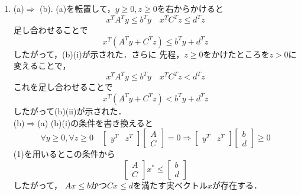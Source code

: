 \begin{enumerate}
\item 
(a)$\Rightarrow$ (b).
(a)を転置して，$y\geq 0, z \geq 0$を右からかけると
\begin{equation}
    x^T A^T y \leq b^T y \quad x^T C^T z \leq d^T z
\end{equation}
足し合わせることで
\begin{equation}
    x^T (A^T y + C^Tz) \leq b^T y + d^T z
\end{equation}
したがって，(b)(i)が示された．さらに
先程，$z\geq0 $をかけたところを$z >0$に変えることで，
\begin{equation}
     x^T A^T y \leq b^T y \quad x^T C^T z < d^T z
\end{equation}
これを足し合わせることで
\begin{equation}
 x^T (A^T y + C^Tz) < b^T y + d^T z
 \end{equation}
 したがって(b)(ii)が示された．\\
 (b)$\Rightarrow$(a)
(b)(i)の条件を書き換えると
\begin{equation}
    \forall y \geq 0, \forall z \geq 0\quad
    \begin{bmatrix}
    y^T & z^T
    \end{bmatrix}
    \begin{bmatrix}
    A \\
    C
    \end{bmatrix}
    = 0 
    \Rightarrow
        \begin{bmatrix}
    y^T & z^T
    \end{bmatrix}
    \begin{bmatrix}
    b\\
    d
    \end{bmatrix}
    \geq 0
\end{equation}
(1)を用いるとこの条件から
\begin{equation}
     \begin{bmatrix}
    A \\
    C
    \end{bmatrix}
    x^\ast \leq    \begin{bmatrix}
    b\\
    d
    \end{bmatrix}
\end{equation}
したがって，
$Ax\leq b$かつ$Cx \leq d$を満たす実ベクトル$x
$が存在する．
\end{enumerate}
